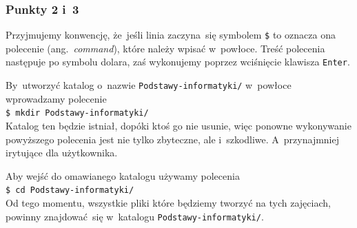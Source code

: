 \documentclass[10pt,t]{beamer}
\begin{document}
\begin{frame}
  \frametitle{Punkty 2 i~3}


  Przyjmujemy konwencję, że~jeśli linia zaczyna~się symbolem
  \texttt{\$} to oznacza ona polecenie (ang.~\textit{command}), które
  należy wpisać w~powłoce. Treść polecenia następuje po symbolu dolara,
  zaś wykonujemy poprzez wciśnięcie klawisza \texttt{Enter}.

  By~utworzyć katalog o~nazwie \texttt{Podstawy-informatyki/} w~powłoce
  wprowadzamy polecenie \\
  \texttt{\$ mkdir Podstawy-informatyki/} \\
  Katalog ten będzie istniał, dopóki ktoś go nie usunie, więc ponowne
  wykonywanie powyższego polecenia jest nie tylko zbyteczne, ale
  i~szkodliwe. A~przynajmniej irytujące dla użytkownika.

  Aby wejść do omawianego katalogu używamy polecenia \\
  \texttt{\$ cd Podstawy-informatyki/} \\
  Od tego momentu, wszystkie pliki które będziemy tworzyć na tych zajęciach,
  powinny znajdować~się w~katalogu \texttt{Podstawy-informatyki/}.

\end{frame}
\end{document}
